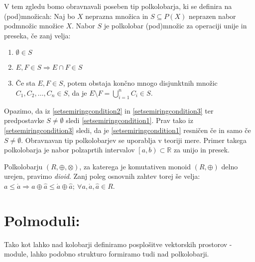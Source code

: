 \documentclass[mat1]{fmfdelo}
\newcommand{\R}{\mathbb R}
\newcommand{\pojem}[1]{\emph{#1}}
\begin{document}
\begin{zgled}
	V tem zgledu bomo obravnavali poseben tip polkolobarja, ki se definira na (pod)množicah:
	Naj bo $X$ neprazna množica in $S \subseteq P(X)$ neprazen nabor podmnožic množice $X$. Nabor $S$ je polkolobar (pod)množic za operaciji unije in preseka, če zanj velja:
	\begin{enumerate}
		\item \label{setsemiringcondition1} $\emptyset\in S$
		\item \label{setsemiringcondition2} $E, F\in S \Rightarrow E\cap F \in S$
		\item \label{setsemiringcondition3} Če sta $E, F \in S$, potem obstaja končno mnogo disjunktnih množic \\ $C_1, C_2, \ldots, C_n \in S$, da je $E\setminus F = \bigcup_{i = 1}^{n}C_i \in S$.
	\end{enumerate}

	Opazimo, da iz \ref{setsemiringcondition2} in \ref{setsemiringcondition3} ter predpostavke $S\neq\emptyset$ sledi \ref{setsemiringcondition1}. Prav tako iz \ref{setsemiringcondition3} sledi, da je \ref{setsemiringcondition1} resničen če in samo če $S \neq \emptyset$. Obravnavan tip polkolobarjev se uporablja v teoriji mere. Primer takega polkolobarja je nabor polzaprtih intervalov $\left[a, b\right) \subset \R$ za unijo in presek.
\end{zgled}

\begin{definicija}
	Polkolobarju $(R, \oplus, \otimes)$, za katerega je komutativen monoid $(R, \oplus)$ delno urejen, pravimo \pojem{dioid}. Zanj poleg osnovnih zahtev torej še velja:\\
	$a \leq \acute{a} \Rightarrow a \oplus \hat{a} \leq \acute{a} \oplus \hat{a};~\forall a, \acute{a},\hat{a}\in R$.
\end{definicija}

\section{Polmoduli:}

Tako kot lahko nad kolobarji definiramo posplošitve vektorskih prostorov - module, lahko podobno strukturo formiramo tudi nad polkolobarji.
\end{document}
